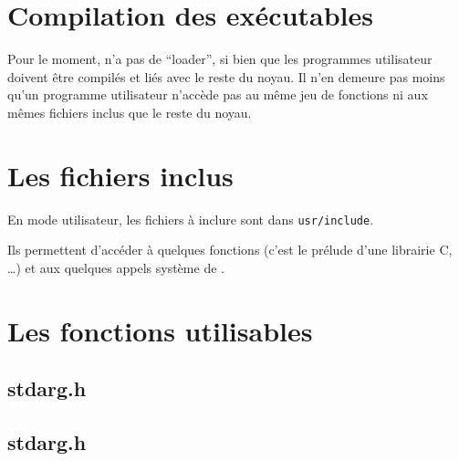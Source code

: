 %
\section{Compilation des exécutables}

   Pour le moment, \manux n'a pas de ``loader'', si bien que les
programmes utilisateur doivent être compilés et liés avec le reste du
noyau. Il n'en demeure pas moins qu'un programme utilisateur n'accède
pas au même jeu de fonctions ni aux mêmes fichiers inclus que le reste
du noyau.

%
\section{Les fichiers inclus}

   En mode utilisateur, les fichiers à inclure sont dans
\lstinline!usr/include!.

   Ils permettent d'accéder à quelques fonctions (c'est le prélude
d'une librairie C, \ldots) et aux quelques appels système de \manux.
   
%
\section{Les fonctions utilisables}


%
\subsection{stdarg.h}

%
\subsection{stdarg.h}

